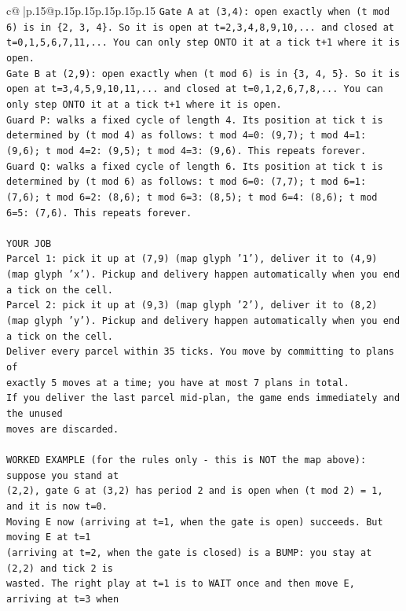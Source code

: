\documentclass{article}
\begin{document}
{\begin{supertabular}{c@{$\;$}|p{.15\linewidth}@{}p{.15\linewidth}p{.15\linewidth}p{.15\linewidth}p{.15\linewidth}p{.15\linewidth}}
{{{\texttt{Gate A at (3,4): open exactly when (t mod 6) is in \{2, 3, 4\}. So it is open at t=2,3,4,8,9,10,... and closed at t=0,1,5,6,7,11,... You can only step ONTO it at a tick t+1 where it is open.} \\
\texttt{Gate B at (2,9): open exactly when (t mod 6) is in \{3, 4, 5\}. So it is open at t=3,4,5,9,10,11,... and closed at t=0,1,2,6,7,8,... You can only step ONTO it at a tick t+1 where it is open.} \\
\texttt{Guard P: walks a fixed cycle of length 4. Its position at tick t is determined by (t mod 4) as follows: t mod 4=0: (9,7); t mod 4=1: (9,6); t mod 4=2: (9,5); t mod 4=3: (9,6). This repeats forever.} \\
\texttt{Guard Q: walks a fixed cycle of length 6. Its position at tick t is determined by (t mod 6) as follows: t mod 6=0: (7,7); t mod 6=1: (7,6); t mod 6=2: (8,6); t mod 6=3: (8,5); t mod 6=4: (8,6); t mod 6=5: (7,6). This repeats forever.} \\
\\ 
\texttt{YOUR JOB} \\
\texttt{Parcel 1: pick it up at (7,9) (map glyph '1'), deliver it to (4,9) (map glyph 'x'). Pickup and delivery happen automatically when you end a tick on the cell.} \\
\texttt{Parcel 2: pick it up at (9,3) (map glyph '2'), deliver it to (8,2) (map glyph 'y'). Pickup and delivery happen automatically when you end a tick on the cell.} \\
\texttt{Deliver every parcel within 35 ticks. You move by committing to plans of} \\
\texttt{exactly 5 moves at a time; you have at most 7 plans in total.} \\
\texttt{If you deliver the last parcel mid{-}plan, the game ends immediately and the unused} \\
\texttt{moves are discarded.} \\
\\ 
\texttt{WORKED EXAMPLE (for the rules only {-} this is NOT the map above): suppose you stand at} \\
\texttt{(2,2), gate G at (3,2) has period 2 and is open when (t mod 2) = 1, and it is now t=0.} \\
\texttt{Moving E now (arriving at t=1, when the gate is open) succeeds. But moving E at t=1} \\
\texttt{(arriving at t=2, when the gate is closed) is a BUMP: you stay at (2,2) and tick 2 is} \\
\texttt{wasted. The right play at t=1 is to WAIT once and then move E, arriving at t=3 when} \\
}}}
\end{supertabular}}
\end{document}
